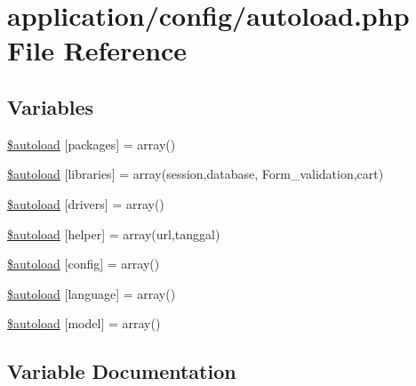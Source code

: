 \hypertarget{autoload_8php}{}\section{application/config/autoload.php File Reference}
\label{autoload_8php}
\subsection*{Variables}
\begin{DoxyCompactItemize}
\item 
\mbox{\hyperlink{autoload_8php_ac5678ca15b21f0795b8466b7583849bf}{\$autoload}} \mbox{[}\textquotesingle{}packages\textquotesingle{}\mbox{]} = array()
\item 
\mbox{\hyperlink{autoload_8php_ad655849207db869167a82844e38957e3}{\$autoload}} \mbox{[}\textquotesingle{}libraries\textquotesingle{}\mbox{]} = array(\textquotesingle{}session\textquotesingle{},\textquotesingle{}database\textquotesingle{}, \textquotesingle{}Form\+\_\+validation\textquotesingle{},\textquotesingle{}cart\textquotesingle{})
\item 
\mbox{\hyperlink{autoload_8php_a7e17f3dd459c588be7378c00952567f0}{\$autoload}} \mbox{[}\textquotesingle{}drivers\textquotesingle{}\mbox{]} = array()
\item 
\mbox{\hyperlink{autoload_8php_ad7a21d85fc61c2b084281ac5dc778805}{\$autoload}} \mbox{[}\textquotesingle{}helper\textquotesingle{}\mbox{]} = array(\textquotesingle{}url\textquotesingle{},\textquotesingle{}tanggal\textquotesingle{})
\item 
\mbox{\hyperlink{autoload_8php_a6731e31354d64020493daeeef0fe6b73}{\$autoload}} \mbox{[}\textquotesingle{}config\textquotesingle{}\mbox{]} = array()
\item 
\mbox{\hyperlink{autoload_8php_a5d6de8162b7a7ef37ac121ab70b1cd87}{\$autoload}} \mbox{[}\textquotesingle{}language\textquotesingle{}\mbox{]} = array()
\item 
\mbox{\hyperlink{autoload_8php_aa7f002455915c322bf25092dff0d419b}{\$autoload}} \mbox{[}\textquotesingle{}model\textquotesingle{}\mbox{]} = array()
\end{DoxyCompactItemize}


\subsection{Variable Documentation}
\mbox{\label{autoload_8php_ac5678ca15b21f0795b8466b7583849bf}} 
